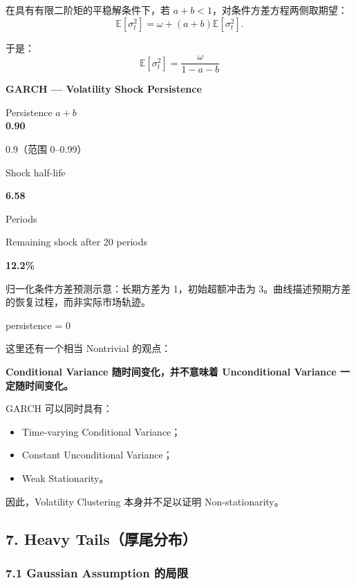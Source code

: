 在具有有限二阶矩的平稳解条件下，若 \(a+b<1\)，对条件方差方程两侧取期望：
\[\mathbb E[\sigma_t^2]
=
\omega
+(a+b)\mathbb E[\sigma_t^2].\]

于是：
\[\boxed{
\mathbb E[\sigma_t^2]
=
\frac{\omega}{1-a-b}
}\]

\textbf{GARCH --- Volatility Shock Persistence}

Persistence \(a+b\)\\
\textbf{0.90}

0.9（范围 0--0.99）


Shock half-life

\textbf{6.58}

Periods

Remaining shock after 20 periods

\textbf{12.2\%}

归一化条件方差预测示意：长期方差为 1，初始超额冲击为 3。曲线描述预期方差的恢复过程，而非实际市场轨迹。

persistence = 0


这里还有一个相当 Nontrivial 的观点：

\textbf{Conditional Variance 随时间变化，并不意味着 Unconditional Variance 一定随时间变化。}

GARCH 可以同时具有：

\begin{itemize}
\tightlist
\item
  Time-varying Conditional Variance；
\item
  Constant Unconditional Variance；
\item
  Weak Stationarity。
\end{itemize}

因此，Volatility Clustering 本身并不足以证明 Non-stationarity。

\hypertarget{part-4-52-0680-heavy-tailsux539aux5c3eux5206ux5e03}{%
\subsection{7. Heavy Tails（厚尾分布）}\label{part-4-52-0680-heavy-tailsux539aux5c3eux5206ux5e03}}

\hypertarget{part-4-52-0680-gaussian-assumption-ux7684ux5c40ux9650}{%
\subsubsection{7.1 Gaussian Assumption 的局限}\label{part-4-52-0680-gaussian-assumption-ux7684ux5c40ux9650}}

